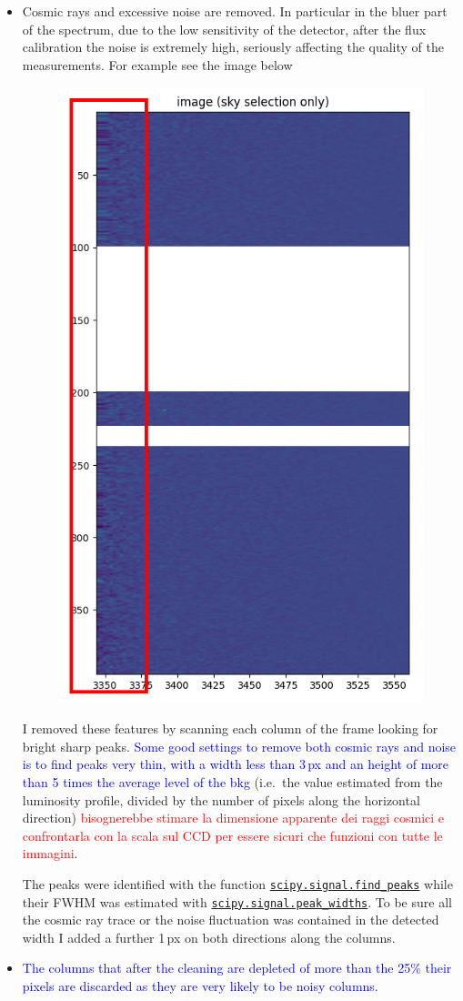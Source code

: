 \documentclass{article}
\newcommand{\arbitrario}[1]{\textcolor{blue}{#1}}
\begin{document}
\begin{itemize}
	\item Cosmic rays and excessive noise are removed. In particular in the bluer part of the spectrum, due to the low sensitivity of the detector, after the flux calibration the noise is extremely high, seriously affecting the quality of the measurements. For example see the image below
	\begin{figure}[h!]
		\centering
		\includegraphics[width=.35\textwidth, angle=90]{10_det}
	\end{figure}
	I removed these features by scanning each column of the frame looking for bright sharp peaks. \arbitrario{Some good settings to remove both cosmic rays and noise is to find peaks very thin, with a width less than 3\,px and an height of more than 5 times the average level of the bkg} (i.e.\ the value estimated from the luminosity profile, divided by the number of pixels along the horizontal direction) \textcolor{red}{bisognerebbe stimare la dimensione apparente dei raggi cosmici e confrontarla con la scala sul CCD per essere sicuri che funzioni con tutte le immagini}.
	
	The peaks were identified with the function \href{https://docs.scipy.org/doc/scipy/reference/generated/scipy.signal.find_peaks.html}{\texttt{scipy.signal.find\_peaks}} while their FWHM was estimated with \href{https://docs.scipy.org/doc/scipy/reference/generated/scipy.signal.peak_widths.html#scipy.signal.peak_widths}{\texttt{scipy.signal.peak\_widths}}. To be sure all the cosmic ray trace or the noise fluctuation was contained in the detected width I added a further 1\,px on both directions along the columns.
	
	\item \arbitrario{The columns that after the cleaning are depleted of more than the 25\% their pixels are discarded as they are very likely to be noisy columns.}
	

\end{itemize}
\end{document}
